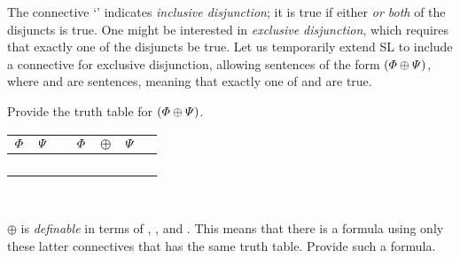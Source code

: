 The connective `\eor' indicates \emph{inclusive disjunction}; it is true if either \emph{or both} of the disjuncts is true. One might be interested in \emph{exclusive disjunction}, which requires that exactly one of the disjuncts be true. Let us temporarily extend SL to include a connective for exclusive disjunction, allowing sentences of the form $(\varPhi{} \oplus \varPsi{})$, where \metaA{} and \metaB{} are sentences, meaning that exactly one of \metaA{} and \metaB{} are true.
\begin{earg}
  \item Provide the truth table for $(\varPhi{} \oplus \varPsi{})$.

  \begin{tabular}{@{ }c@{ }@{ }c | c@{ }@{ }c@{ }@{ }c@{ }@{ }c@{ }@{ }c}
    $\varPhi{}$ & $\varPsi{}$ &  & $\varPhi{}$ & $\oplus$ & $\varPsi{}$ & \\
    \hline 
     &  &  &  &  & & \\
     &  &  &  &  &  & \\
     &  &  &  &  &  & \\
     &  &  &  &  &  & \\
  \end{tabular}\\

  \item $\oplus$ is \emph{definable} in terms of \eor, \eand, and \enot. This means that there is a formula using only these latter connectives that has the same truth table. Provide such a formula.
\end{earg}


\fi
